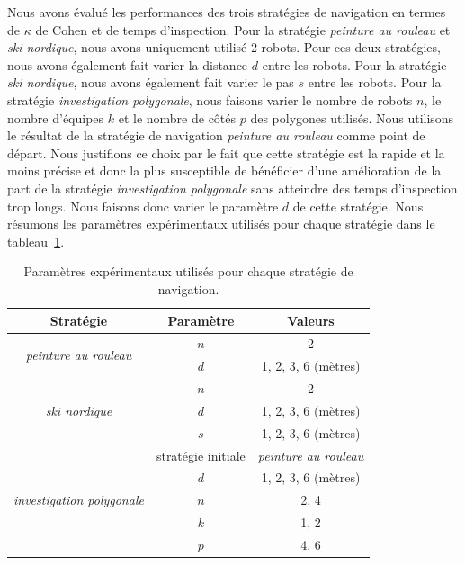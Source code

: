 \documentclass[francais,RandD]{rapportPFE}
\begin{document}
		Nous avons évalué les performances des trois stratégies de navigation en termes de $\kappa$ de Cohen et de temps d'inspection.
		Pour la stratégie \textit{peinture au rouleau} et \textit{ski nordique}, nous avons uniquement utilisé 2 robots.
		Pour ces deux stratégies, nous avons également fait varier la distance $d$ entre les robots.
		Pour la stratégie \textit{ski nordique}, nous avons également fait varier le pas $s$ entre les robots.
		Pour la stratégie \textit{investigation polygonale}, nous faisons varier le nombre de robots $n$, le nombre d'équipes $k$ et le nombre de côtés $p$ des polygones utilisés.
		Nous utilisons le résultat de la stratégie de navigation \textit{peinture au rouleau} comme point de départ.
		Nous justifions ce choix par le fait que cette stratégie est la rapide et la moins précise et donc la plus susceptible de bénéficier d'une amélioration de la part de la stratégie \textit{investigation polygonale} sans atteindre des temps d'inspection trop longs.
		Nous faisons donc varier le paramètre $d$ de cette stratégie.
		Nous résumons les paramètres expérimentaux utilisés pour chaque stratégie dans le tableau~\ref{tab:exp_params}.

		\begin{table}[h!]
			\centering
			\begin{tabular}{|c|c|c|}
				\hline
				Stratégie & Paramètre & Valeurs \\
				\hline
				\multirow{2}{*}{\textit{peinture au rouleau}} & $n$ & 2 \\
				& $d$ & 1, 2, 3, 6 (mètres) \\
				\hline
				\multirow{3}{*}{\textit{ski nordique}} & $n$ & 2 \\
				& $d$ & 1, 2, 3, 6 (mètres) \\
				& $s$ & 1, 2, 3, 6 (mètres) \\
				\hline
				\multirow{5}{*}{\textit{investigation polygonale}} & stratégie initiale & \textit{peinture au rouleau} \\
				& $d$ & 1, 2, 3, 6 (mètres) \\
				& $n$ & 2, 4 \\
				& $k$ & 1, 2 \\
				& $p$ & 4, 6 \\
				\hline
			\end{tabular}
			\caption{Paramètres expérimentaux utilisés pour chaque stratégie de navigation.}
			\label{tab:exp_params}
		\end{table}
\end{document}
